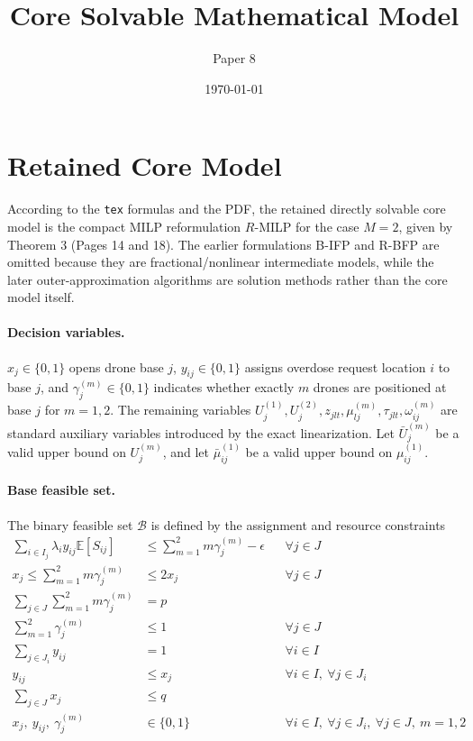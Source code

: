 \documentclass{article}
\title{Core Solvable Mathematical Model}
\author{Paper 8}
\date{\today}
\begin{document}
\maketitle

\section*{Retained Core Model}
According to the \texttt{tex} formulas and the PDF, the retained directly solvable core model is
the compact MILP reformulation $R$-MILP for the case $M=2$, given by Theorem 3 (Pages 14 and
18). The earlier formulations B-IFP and R-BFP are omitted because they are fractional/nonlinear
intermediate models, while the later outer-approximation algorithms are solution methods rather
than the core model itself.

\paragraph{Decision variables.}
$x_j \in \{0,1\}$ opens drone base $j$, $y_{ij}\in\{0,1\}$ assigns overdose request location $i$
to base $j$, and $\gamma_j^{(m)}\in\{0,1\}$ indicates whether exactly $m$ drones are positioned
at base $j$ for $m=1,2$. The remaining variables
$U_j^{(1)},U_j^{(2)},z_{jlt},\mu_{lj}^{(m)},\tau_{jlt},\omega_{ij}^{(m)}$
are standard auxiliary variables introduced by the exact linearization.
Let $\bar U_j^{(m)}$ be a valid upper bound on $U_j^{(m)}$, and let
$\bar\mu_{ij}^{(1)}$ be a valid upper bound on $\mu_{ij}^{(1)}$.

\paragraph{Base feasible set.}
The binary feasible set $\mathcal B$ is defined by the assignment and resource constraints
\begin{align}
\sum_{i \in I_j} \lambda_i y_{ij}\mathbb{E}[S_{ij}] &\le \sum_{m=1}^{2} m\gamma_j^{(m)} - \epsilon
&& \forall j \in J \tag{9b}\\
x_j \le \sum_{m=1}^{2} m\gamma_j^{(m)} &\le 2x_j
&& \forall j \in J \tag{9c}\\
\sum_{j \in J} \sum_{m=1}^{2} m\gamma_j^{(m)} &= p \tag{9d}\\
\sum_{m=1}^{2} \gamma_j^{(m)} &\le 1
&& \forall j \in J \tag{9e}\\
\sum_{j \in J_i} y_{ij} &= 1
&& \forall i \in I \tag{8c}\\
y_{ij} &\le x_j
&& \forall i \in I,\ \forall j \in J_i \tag{8d}\\
\sum_{j \in J} x_j &\le q \tag{8e}\\
x_j,\ y_{ij},\ \gamma_j^{(m)} &\in \{0,1\}
&& \forall i \in I,\ \forall j \in J_i,\ \forall j \in J,\ m=1,2 \tag{8h/9f}
\end{align}
\end{document}
